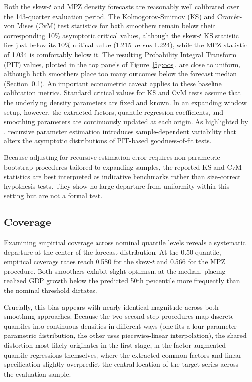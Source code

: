 \documentclass[12pt]{report} %
\begin{document}
Both the skew-$t$ and MPZ density forecasts are reasonably well calibrated over the 143-quarter evaluation period. The Kolmogorov-Smirnov (KS) and Cramér-von Mises (CvM) test statistics for both smoothers remain below their corresponding 10\% asymptotic critical values, although the skew-$t$ KS statistic lies just below its 10\% critical value (1.215 versus 1.224), while the MPZ statistic of 1.034 is comfortably below it. The resulting Probability Integral Transform (PIT) values, plotted in the top panels of Figure~\ref{fig:oos}, are close to uniform, although both smoothers place too many outcomes below the forecast median (Section~\ref{subsec:coverage}). An important econometric caveat applies to these baseline calibration metrics. Standard critical values for KS and CvM tests assume that the underlying density parameters are fixed and known. In an expanding window setup, however, the extracted factors, quantile regression coefficients, and smoothing parameters are continuously updated at each origin. As highlighted by \textcite{rossi2019alternative}, recursive parameter estimation introduces sample-dependent variability that alters the asymptotic distributions of PIT-based goodness-of-fit tests.

Because adjusting for recursive estimation error requires non-parametric bootstrap procedures tailored to expanding samples, the reported KS and CvM statistics are best interpreted as indicative benchmarks rather than size-correct hypothesis tests. They show no large departure from uniformity within this setting but are not a formal test.

\subsection{Coverage}
\label{subsec:coverage}

Examining empirical coverage across nominal quantile levels reveals a systematic departure at the center of the forecast distribution. At the 0.50 quantile, empirical coverage rates reach 0.580 for the skew-$t$ and 0.566 for the MPZ procedure. Both smoothers exhibit slight optimism at the median, placing realized GDP growth below the predicted 50th percentile more frequently than the nominal threshold dictates.

Crucially, this bias appears with nearly identical magnitude across both smoothing approaches. Because the two second-step procedures map discrete quantiles into continuous densities in different ways (one fits a four-parameter parametric distribution, the other uses piecewise-linear interpolation), the shared distortion most likely originates in the first stage, in the factor-augmented quantile regressions themselves, where the extracted common factors and linear specification slightly overpredict the central location of the target series across the evaluation sample.
\end{document}
